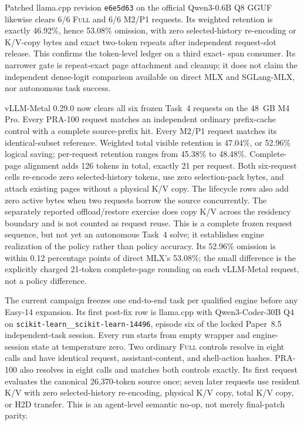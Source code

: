 \documentclass[11pt]{article}
\begin{document}
Patched llama.cpp revision \texttt{e6e5d63} on the official Qwen3-0.6B Q8
GGUF likewise clears 6/6 \textsc{Full} and 6/6 M2/P1 requests.  Its weighted
retention is exactly 46.92\%, hence 53.08\% omission, with zero selected-history
re-encoding or K/V-copy bytes and exact two-token repeats after independent
request-slot release.  This confirms the token-level ledger on a third exact-
span consumer.  Its narrower gate is repeat-exact page attachment and cleanup;
it does not claim the independent dense-logit comparison available on direct
MLX and SGLang-MLX, nor autonomous task success.

vLLM-Metal 0.29.0 now clears all six frozen Task~4 requests on the 48~GB M4
Pro.  Every PRA-100 request matches an independent ordinary prefix-cache
control with a complete source-prefix hit.  Every M2/P1 request matches its
identical-subset reference.  Weighted total visible retention is 47.04\%, or
52.96\% logical saving; per-request retention ranges from 45.38\% to 48.48\%.
Complete-page alignment adds 126 tokens in total, exactly 21 per request.
Both six-request cells re-encode zero selected-history tokens, use zero
selection-pack bytes, and attach existing pages without a physical K/V copy.
The lifecycle rows also add zero active bytes when two requests borrow the
source concurrently.  The separately reported offload/restore exercise does
copy K/V across the residency boundary and is not counted as request reuse.
This is a complete frozen request sequence, but not yet an autonomous Task~4
solve; it establishes engine realization of the policy rather than policy
accuracy.  Its 52.96\% omission is within 0.12 percentage points of direct
MLX's 53.08\%; the small difference is the explicitly charged 21-token
complete-page rounding on each vLLM-Metal request, not a policy difference.

The current campaign freezes one end-to-end task per qualified engine before
any Easy-14 expansion.  Its first post-fix row is llama.cpp with
Qwen3-Coder-30B Q4 on \texttt{scikit-learn\_\_scikit-learn-14496}, episode six
of the locked Paper~8.5 independent-task session.  Every run starts from empty
wrapper and engine-session state at temperature zero.  Two ordinary
\textsc{Full} controls resolve in eight calls and have identical request,
assistant-content, and shell-action hashes.  PRA-100 also resolves in eight
calls and matches both controls exactly.  Its first request evaluates the
canonical 26,370-token source once; seven later requests use resident K/V with
zero selected-history re-encoding, physical K/V copy, total K/V copy, or H2D
transfer.  This is an agent-level semantic no-op, not merely final-patch parity.
\end{document}
